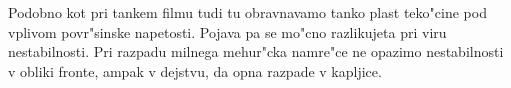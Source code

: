 \documentclass[a4paper,10pt]{article}
\renewcommand{\vec}{\mathbf}
\newcommand{\odv}[1]{\frac{\partial #1}{\partial t}}
\begin{document}
Podobno kot pri tankem filmu tudi tu obravnavamo tanko plast teko"cine pod vplivom povr"sinske napetosti. Pojava pa se mo"cno razlikujeta pri viru nestabilnosti. Pri razpadu milnega mehur"cka namre"ce ne opazimo nestabilnosti v obliki fronte, ampak v dejstvu, da opna razpade v kapljice. 

\end{document}
